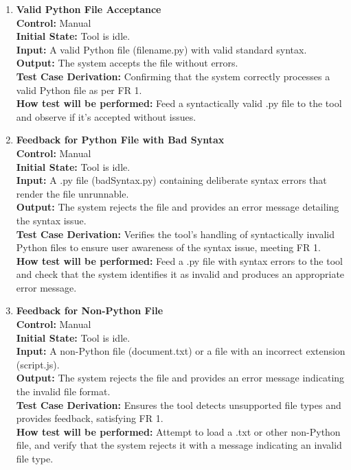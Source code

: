 \documentclass[12pt, titlepage]{article}
\begin{document}
\begin{enumerate}[label={\bf
    \textcolor{Maroon}{test-FR-IA-\arabic*}}, wide=0pt, font=\itshape]
  \item \textbf{Valid Python File Acceptance} \\[2mm]
    \textbf{Control:} Manual \\
    \textbf{Initial State:} Tool is idle.  \\
    \textbf{Input:} A valid Python file (filename.py) with valid
    standard syntax. \\
    \textbf{Output:} The system accepts the file without errors.\\[2mm]
    \textbf{Test Case Derivation:} Confirming that the system
    correctly processes a valid Python file as per FR 1.\\[2mm]
    \textbf{How test will be performed:} Feed a syntactically valid
    .py file to the tool and observe if it’s accepted without issues.

  \item \textbf{Feedback for Python File with Bad Syntax} \\[2mm]
    \textbf{Control:} Manual \\
    \textbf{Initial State:} Tool is idle. \\
    \textbf{Input:} A .py file (badSyntax.py) containing deliberate
    syntax errors that render the file unrunnable. \\
    \textbf{Output:} The system rejects the file and provides an
    error message detailing the syntax issue. \\[2mm]
    \textbf{Test Case Derivation:} Verifies the tool’s handling of
    syntactically invalid Python files to ensure user awareness of
    the syntax issue, meeting FR 1. \\[2mm]
    \textbf{How test will be performed:} Feed a .py file with syntax
    errors to the tool and check that the system identifies it as
    invalid and produces an appropriate error message.

  \item \textbf{Feedback for Non-Python File}\\[2mm]
    \textbf{Control:} Manual \\
    \textbf{Initial State:} Tool is idle.\\
    \textbf{Input:} A non-Python file (document.txt) or a file with
    an incorrect extension (script.js).\\
    \textbf{Output:} The system rejects the file and provides an
    error message indicating the invalid file format.\\[2mm]
    \textbf{Test Case Derivation:} Ensures the tool detects
    unsupported file types and provides feedback, satisfying FR 1.\\[2mm]
    \textbf{How test will be performed:} Attempt to load a .txt or
    other non-Python file, and verify that the system rejects it with
    a message indicating an invalid file type.


\end{enumerate}
\end{document}
